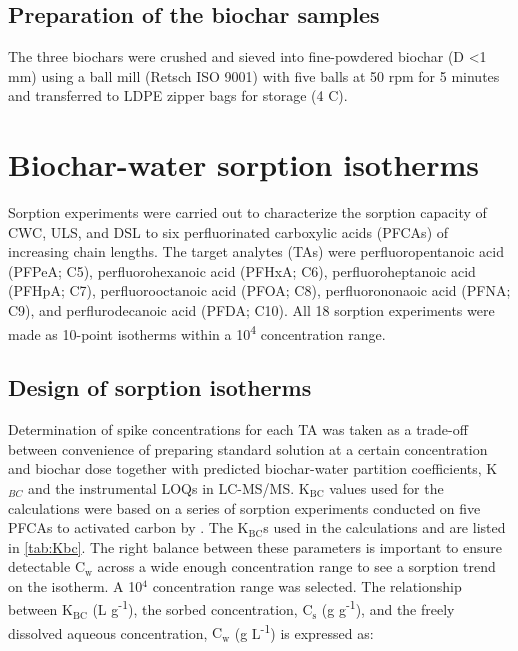 \subsection{Preparation of the biochar samples}
The three biochars were crushed and sieved into fine-powdered biochar (D \textless 1 mm) using a ball mill (Retsch ISO 9001) with five balls at 50 rpm for 5 minutes and transferred to LDPE zipper bags for storage (4 \textdegree C). 


\section{Biochar-water sorption isotherms}
Sorption experiments were carried out to characterize the sorption capacity of CWC, ULS, and DSL to six perfluorinated carboxylic acids (PFCAs) of increasing chain lengths. The target analytes (TAs) were perfluoropentanoic acid (PFPeA; C5), perfluorohexanoic acid (PFHxA; C6), perfluoroheptanoic acid (PFHpA; C7), perfluorooctanoic acid (PFOA; C8), perfluorononaoic acid (PFNA; C9), and perflurodecanoic acid (PFDA; C10). All 18 sorption experiments were made as 10-point isotherms within a 10\textsuperscript{4} concentration range. 

\subsection{Design of sorption isotherms}
Determination of spike concentrations for each TA was taken as a trade-off between convenience of preparing standard solution at a certain concentration and biochar dose together with predicted biochar-water partition coefficients, K$_{BC}$ and the instrumental LOQs in LC-MS/MS. $\mathrm{K_{BC}}$ values used for the calculations were based on a series of sorption experiments conducted on five PFCAs to activated carbon by \cite{Xiao2017}. The $\mathrm{K_{BC}}$s used in the calculations and are listed in \cref{tab:Kbc}. The right balance between these parameters is important to ensure detectable $\mathrm{C_w}$ across a wide enough concentration range to see a sorption trend on the isotherm. A 10$^4$ concentration range was selected. The relationship between $\mathrm{K_{BC}}$ (L g\textsuperscript{-1}), the sorbed concentration, $\mathrm{C_s}$ (\textmu g g\textsuperscript{-1}), and the freely dissolved aqueous concentration, $\mathrm{C_w}$ (\textmu g L\textsuperscript{-1}) is expressed as:

